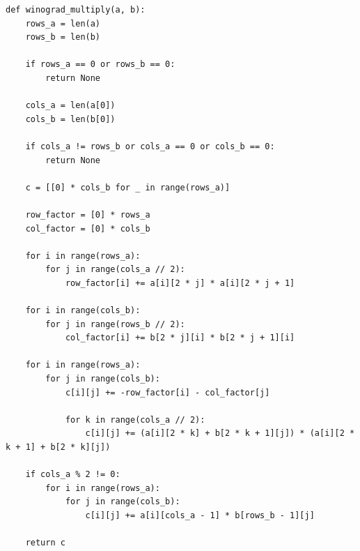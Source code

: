 \begin{lstlisting}[style=python, label=lst:wyn,caption=Алгоритм Винограда]
def winograd_multiply(a, b):
    rows_a = len(a)
    rows_b = len(b)

    if rows_a == 0 or rows_b == 0:
        return None

    cols_a = len(a[0])
    cols_b = len(b[0])

    if cols_a != rows_b or cols_a == 0 or cols_b == 0:
        return None

    c = [[0] * cols_b for _ in range(rows_a)]

    row_factor = [0] * rows_a
    col_factor = [0] * cols_b

    for i in range(rows_a):
        for j in range(cols_a // 2):
            row_factor[i] += a[i][2 * j] * a[i][2 * j + 1]

    for i in range(cols_b):
        for j in range(rows_b // 2):
            col_factor[i] += b[2 * j][i] * b[2 * j + 1][i]

    for i in range(rows_a):
        for j in range(cols_b):
            c[i][j] += -row_factor[i] - col_factor[j]

            for k in range(cols_a // 2):
                c[i][j] += (a[i][2 * k] + b[2 * k + 1][j]) * (a[i][2 * k + 1] + b[2 * k][j])

    if cols_a % 2 != 0:
        for i in range(rows_a):
            for j in range(cols_b):
                c[i][j] += a[i][cols_a - 1] * b[rows_b - 1][j]

    return c
\end{lstlisting}

\clearpage

